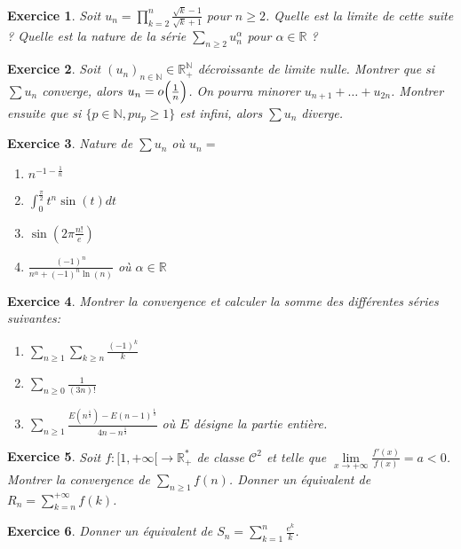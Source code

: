 \documentclass[12pt]{article}
\newtheorem{exercise}{Exercice}[section]
\theoremstyle{remark}
\theoremstyle{remark}
\newcommand{\R}{\mathbb{R}}
\newcommand{\N}{\mathbb{N}}
\begin{document}
\begin{exercise}
	Soit $u_{n}=\prod_{k=2}^{n}\frac{\sqrt{k}-1}{\sqrt{k}+1}$ pour $n\geqslant
	2$. Quelle est la limite de cette suite ? Quelle est la nature de la série
	$\sum_{n\geqslant 2}u_{n}^{\alpha}$ pour $\alpha\in\R$ ?
\end{exercise}

\begin{exercise}
	Soit $(u_{n})_{n\in\N}\in\R_{+}^{\N}$ décroissante de limite nulle. Montrer
	que si $\sum u_{n}$ converge, alors $u_{n}=o\Bigl(\frac{1}{n}\Bigr)$. On
	pourra minorer $u_{n+1}+\dots+u_{2n}$. Montrer ensuite que si $\{p\in\N,
	pu_{p}\geqslant1\}$ est infini, alors $\sum u_{n}$ diverge.
\end{exercise}

\begin{exercise}
	Nature de $\sum u_{n}$ où $u_{n}=$
	\begin{enumerate}
		\item $n^{-1-\frac{1}{n}}$
		\item $\int_{0}^{\frac{\pi}{2}}t^{n}\sin(t)dt$
		\item $\sin(2\pi\frac{n!}{e})$
		\item $\frac{(-1)^{n}}{n^{\alpha}+(-1)^{n}\ln(n)}$ où $\alpha\in\R$
	\end{enumerate}
\end{exercise}

\begin{exercise}
	Montrer la convergence et calculer la somme des différentes séries
	suivantes:
	\begin{enumerate}
		\item $\sum_{n\geqslant1}\sum_{k\geqslant n}\frac{(-1)^{k}}{k}$
		\item $\sum_{n\geqslant0}\frac{1}{(3n)!}$
		\item
		$\sum_{n\geqslant1}\frac{E(n^{\frac{1}{3}})-E(n-1)^{\frac{1}{3}}}{4n-n^{\frac{1}{3}}}$
		où $E$ désigne la partie entière.
	\end{enumerate}
\end{exercise}

\begin{exercise}
	Soit $f:[1,+\infty[\to\R_{+}^{*}$ de classe $\mathcal{C}^{2}$ et telle que
	$\lim\limits_{x\to+\infty}\frac{f'(x)}{f(x)}=a<0$. Montrer la convergence de
	$\sum_{n\geqslant1}f(n)$. Donner un équivalent de
	$R_{n}=\sum_{k=n}^{+\infty} f(k)$.
\end{exercise}

\begin{exercise}
	Donner un équivalent de $S_{n}=\sum_{k=1}^{n}\frac{e^{k}}{k}$.
\end{exercise}
\end{document}

